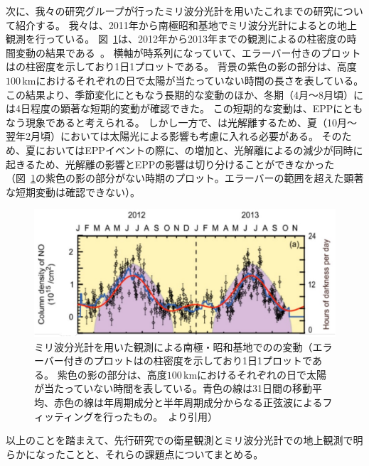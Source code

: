 次に、我々の研究グループが行ったミリ波分光計を用いたこれまでの研究について紹介する。
我々は、2011年から南極昭和基地でミリ波分光計によるとの地上観測を行っている。
図~\ref{fig:isono2014ground_fig5a}は、2012年から2013年までの観測によるの柱密度の時間変動の結果である~\cite{isono2014ground}。
横軸が時系列になっていて、エラーバー付きのプロットはの柱密度を示しており1日1プロットである。
背景の紫色の影の部分は、高度$100\, \mathrm{km}$におけるそれぞれの日で太陽が当たっていない時間の長さを表している。
この結果より、季節変化にともなう長期的な変動のほか、冬期（4月〜8月頃）には4日程度の顕著な短期的変動が確認できた。
この短期的な変動は、EPPにともなう現象であると考えられる。
しかし一方で、は光解離するため、夏（10月〜翌年2月頃）においては太陽光による影響も考慮に入れる必要がある。
そのため、夏においてはEPPイベントの際に、の増加と、光解離によるの減少が同時に起きるため、光解離の影響とEPPの影響は切り分けることができなかった（図~\ref{fig:isono2014ground_fig5a}の紫色の影の部分がない時期のプロット。エラーバーの範囲を超えた顕著な短期変動は確認できない）。
\begin{figure}[htbp]
    \centering
    \includegraphics[width=\linewidth]{master_thesis_contents/master_thesis_fig/isono2014ground_fig5a.pdf}
    \caption{ミリ波分光計を用いた観測による南極・昭和基地でのの変動（エラーバー付きのプロットはの柱密度を示しており1日1プロットである。
    紫色の影の部分は、高度$100\, \mathrm{km}$におけるそれぞれの日で太陽が当たっていない時間を表している。青色の線は31日間の移動平均、赤色の線は年周期成分と半年周期成分からなる正弦波によるフィッティングを行ったもの。~\cite{isono2014ground}より引用）}
    \label{fig:isono2014ground_fig5a}
\end{figure}
以上のことを踏まえて、先行研究での衛星観測とミリ波分光計での地上観測で明らかになったことと、それらの課題点についてまとめる。
\clearpage
